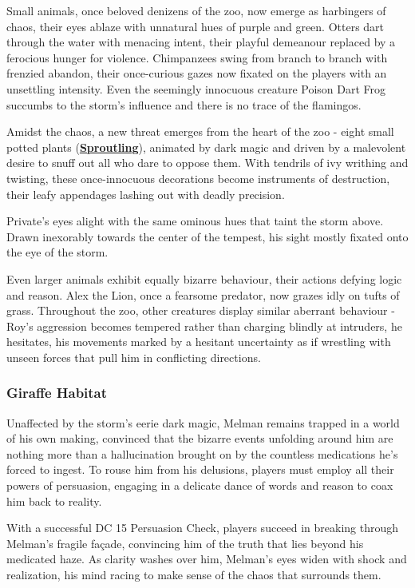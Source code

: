 Small animals, once beloved denizens of the zoo, now emerge as harbingers of chaos, their eyes ablaze with unnatural hues of purple and green. Otters dart through the water with menacing intent, their playful demeanour replaced by a ferocious hunger for violence. Chimpanzees swing from branch to branch with frenzied abandon, their once-curious gazes now fixated on the players with an unsettling intensity. Even the seemingly innocuous creature Poison Dart Frog succumbs to the storm's influence and there is no trace of the flamingos.

Amidst the chaos, a new threat emerges from the heart of the zoo - eight small potted plants (\hyperref[sec:Sproutling]{\textbf{Sproutling}}), animated by dark magic and driven by a malevolent desire to snuff out all who dare to oppose them. With tendrils of ivy writhing and twisting, these once-innocuous decorations become instruments of destruction, their leafy appendages lashing out with deadly precision.

Private's eyes alight with the same ominous hues that taint the storm above. Drawn inexorably towards the center of the tempest, his sight mostly fixated onto the eye of the storm.

Even larger animals exhibit equally bizarre behaviour, their actions defying logic and reason. Alex the Lion, once a fearsome predator, now grazes idly on tufts of grass. Throughout the zoo, other creatures display similar aberrant behaviour - Roy's aggression becomes tempered rather than charging blindly at intruders, he hesitates, his movements marked by a hesitant uncertainty as if wrestling with unseen forces that pull him in conflicting directions.

\subsubsection*{ Giraffe Habitat}
Unaffected by the storm's eerie dark magic, Melman remains trapped in a world of his own making, convinced that the bizarre events unfolding around him are nothing more than a hallucination brought on by the countless medications he's forced to ingest. To rouse him from his delusions, players must employ all their powers of persuasion, engaging in a delicate dance of words and reason to coax him back to reality.

With a successful DC 15 Persuasion Check, players succeed in breaking through Melman's fragile façade, convincing him of the truth that lies beyond his medicated haze. As clarity washes over him, Melman's eyes widen with shock and realization, his mind racing to make sense of the chaos that surrounds them.

